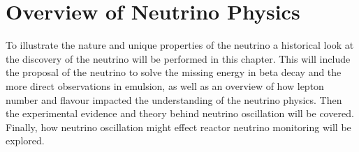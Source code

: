 

\ifpdf
    \graphicspath{{Chapter2/Figs/Raster/}{Chapter2/Figs/PDF/}{Chapter2/Figs/}}
\else
    \graphicspath{{Chapter2/Figs/Vector/}{Chapter2/Figs/}}
\fi


\chapter{Overview of Neutrino Physics}\label{Chp:ABfriefHistoryOfNeutrinos} 
To illustrate the nature and unique properties of the neutrino a historical look at the discovery of the neutrino will be performed in this chapter. This will include the proposal of the neutrino to solve the missing energy in beta decay and the more direct observations in emulsion, as well as an overview of how lepton number and flavour impacted the understanding of the neutrino physics. Then the experimental evidence and theory behind neutrino oscillation will be covered. Finally, how neutrino oscillation might effect reactor neutrino monitoring will be explored. %


